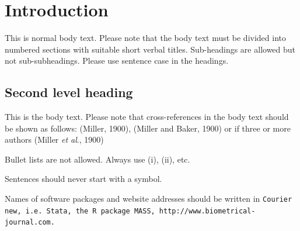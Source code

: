 \documentclass[bimj,fleqn]{w-art}
\theoremstyle{plain}
\theoremstyle{definition}
\begin{document}
\maketitle                   %







\section{Introduction}

This is normal body text. Please note that the body text must be divided into numbered sections with
suitable short verbal titles. Sub-headings are allowed but not sub-subheadings. Please use sentence case in the
headings.

\subsection{Second level heading}

This is the body text. Please note that cross-references in the body text should be shown as follows:
(Miller, 1900), (Miller and Baker, 1900) or if three or more authors (Miller {\it{et al}}., 1900)
\vspace*{12pt}

\noindent Bullet lists are not allowed. Always use (i), (ii), etc.
\vspace*{12pt}

\noindent Sentences should never start with a symbol.
\vspace*{12pt}

\noindent Names of software packages and website addresses should be written in {\tt{Courier new, i.e. Stata, the R package
MASS, http://www.biometrical-journal.com.}}
\end{document}
